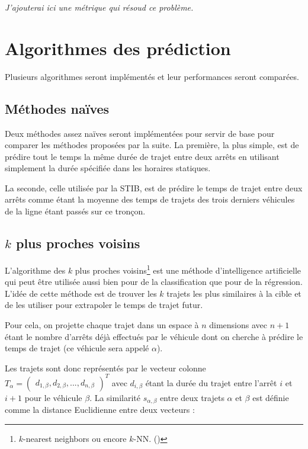 \documentclass[letterpaper]{article}
\begin{document}
\textit{J'ajouterai ici une métrique qui résoud ce problème.}

\section{Algorithmes des prédiction}
Plusieurs algorithmes seront implémentés et leur performances seront comparées.

\subsection{Méthodes naïves}
Deux méthodes assez naïves seront implémentées pour servir de base pour comparer les méthodes proposées par la suite.
La première, la plus simple, est de prédire tout le temps la même durée de trajet entre deux arrêts en utilisant simplement la durée spécifiée dans les horaires statiques.

La seconde, celle utilisée par la STIB, est de prédire le temps de trajet entre deux arrêts comme étant la moyenne des temps de trajets des trois derniers véhicules de la ligne étant passés sur ce tronçon.

\subsection{$k$ plus proches voisins}

L'algorithme des $k$ plus proches voisins\footnote{$k$-nearest neighbors ou encore $k$-NN. (\cite{trevor2009elements})}
est une méthode d'intelligence artificielle qui peut être utilisée aussi bien pour de la classification que pour de la régression.
L'idée de cette méthode est de trouver les $k$ trajets les plus similaires à la cible et de les utiliser pour extrapoler le temps de trajet futur.

Pour cela, on projette chaque trajet dans un espace à $n$ dimensions avec $n+1$ étant le nombre d'arrêts déjà effectués par le véhicule dont on cherche à prédire le temps de trajet (ce véhicule sera appelé $\alpha$).

Les trajets sont donc représentés par le vecteur colonne
$T_{\alpha} = \begin{pmatrix}d_{1,\beta}, d_{2,\beta}, ..., d_{n,\beta}\end{pmatrix}^{T}$
avec $d_{i,\beta}$ étant la durée du trajet entre l'arrêt $i$ et $i+1$ pour le véhicule $\beta$.
La similarité $s_{\alpha,\beta}$ entre deux trajets $\alpha$ et $\beta$ est définie comme la distance Euclidienne entre deux vecteurs :
\end{document}
